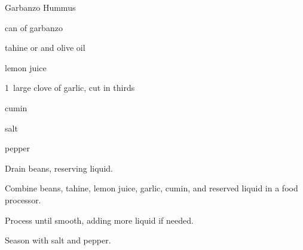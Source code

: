 \begin{recipe}{Garbanzo Hummus}{}{}

\begin{ingredients}
\item {} can of garbanzo 
\item \C{\quarter} tahine or \C{\quarter}  and  olive oil
\item {} lemon juice
\item 1~large clove of garlic, cut in thirds
\item \tp{\quarter} cumin
\item salt
\item pepper
\end{ingredients}

\begin{directions}
\item Drain beans, reserving liquid.
\item Combine beans, tahine, lemon juice, garlic, cumin, and \C{\quarter} reserved liquid in a food processor.
\item Process until smooth, adding more liquid if needed.
\item Season with salt and pepper.
\end{directions}

\end{recipe}
